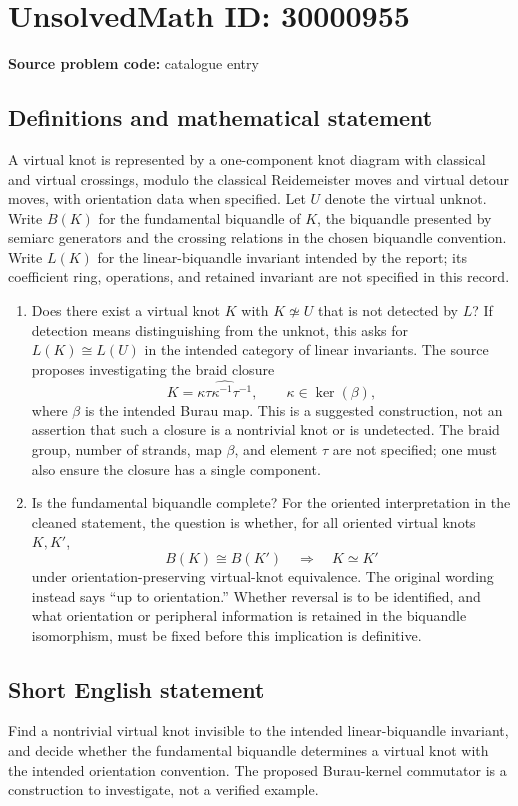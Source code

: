 \documentclass[11pt]{article}
\begin{document}
\section*{UnsolvedMath ID: 30000955}
\textbf{Source problem code:} catalogue entry
\subsection{Definitions and mathematical statement}
A virtual knot is represented by a one-component knot diagram with classical and virtual crossings, modulo the classical Reidemeister moves and virtual detour moves, with orientation data when specified. Let \(U\) denote the virtual unknot. Write \(B(K)\) for the fundamental biquandle of \(K\), the biquandle presented by semiarc generators and the crossing relations in the chosen biquandle convention. Write \(L(K)\) for the linear-biquandle invariant intended by the report; its coefficient ring, operations, and retained invariant are not specified in this record.
\begin{enumerate}
\item Does there exist a virtual knot \(K\) with \(K\not\simeq U\) that is not detected by \(L\)? If detection means distinguishing from the unknot, this asks for \(L(K)\cong L(U)\) in the intended category of linear invariants. The source proposes investigating the braid closure
\[
K=\widehat{\kappa\tau\kappa^{-1}\tau^{-1}},\qquad \kappa\in\ker(\beta),
\]
where \(\beta\) is the intended Burau map. This is a suggested construction, not an assertion that such a closure is a nontrivial knot or is undetected. The braid group, number of strands, map \(\beta\), and element \(\tau\) are not specified; one must also ensure the closure has a single component.
\item Is the fundamental biquandle complete? For the oriented interpretation in the cleaned statement, the question is whether, for all oriented virtual knots \(K,K'\),
\[
B(K)\cong B(K')\quad\Longrightarrow\quad K\simeq K'
\]
under orientation-preserving virtual-knot equivalence. The original wording instead says ``up to orientation.'' Whether reversal is to be identified, and what orientation or peripheral information is retained in the biquandle isomorphism, must be fixed before this implication is definitive.
\end{enumerate}
\subsection{Short English statement}
Find a nontrivial virtual knot invisible to the intended linear-biquandle invariant, and decide whether the fundamental biquandle determines a virtual knot with the intended orientation convention. The proposed Burau-kernel commutator is a construction to investigate, not a verified example.
\end{document}
